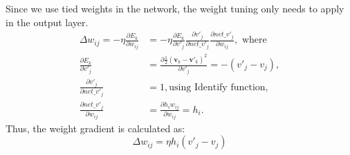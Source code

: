 \documentclass[conference]{IEEEtran}
\begin{document}
	Since we use tied weights in the network, the weight tuning only needs to apply in the output layer.
	\begin{equation}
	\begin{aligned}
	\Delta w_{ij} = -\eta \frac{\partial E_k}{\partial w_{ij}} &= -\eta \frac{\partial E_k}{\partial v'_j} \frac{\partial v'_j}{\partial net\_v'_j} \frac{\partial net\_v'_j}{\partial w_{ij}}, \textrm{ where} \\
	\frac{\partial E_k}{\partial v'_j} &= \frac{\partial \frac{1}{2}(\mathbf{v}_k - \mathbf{v'}_k)^2}{\partial v'_j}= -(v'_j - v_j), \\
	\frac{\partial v'_j}{\partial net\_v'_j} &= 1, \textrm{using Identify function,}\\
	\frac{\partial net\_v'_j}{\partial w_{ij}} &= \frac{\partial h_i w_{ij}}{\partial w_{ij}} = h_i.
	\end{aligned}
	\end{equation}
	Thus, the weight gradient is calculated as:
	\begin{equation}
	\Delta w_{ij} = \eta h_i(v'_j - v_j)
	\end{equation}
	
\end{document}
